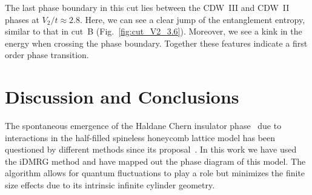 \documentclass[aps,prx,10pt,twocolumn,floatfix,superscriptaddress,showpacs,numerical,footinbib]{revtex4-1}
\begin{document}
The last phase boundary in this cut lies between the CDW~III and CDW~II phases at $V_2/t \approx 2.8$.
%
Here, we can see a clear jump of the entanglement entropy, similar to that in cut~B (Fig.~\ref{fig:cut_V2_3.6}).
%
Moreover, we see a kink in the energy when crossing the phase boundary.
%
Together these features indicate a first order phase transition.



\section{\label{sec:discconc}Discussion and Conclusions}
%

The spontaneous emergence of the Haldane Chern insulator phase~\cite{H88} due to interactions in the half-filled spineless honeycomb lattice
model has been questioned by different methods since its proposal~\cite{RQHZ08,WF10,GCC13,GGNVC13,DH14,DCH14}.
%
In this work we have used the iDMRG method and have mapped out the phase diagram of this model.
%
The algorithm allows for quantum fluctuations to play a role but minimizes the finite size effects due to its intrinsic infinite cylinder geometry.
%
\end{document}
